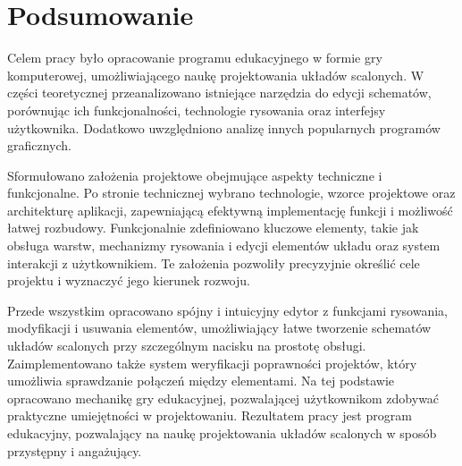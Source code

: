 \chapter{Podsumowanie}
\label{ch:podsumowanie}

Celem pracy było opracowanie programu edukacyjnego w formie gry komputerowej,
umożliwiającego naukę projektowania układów scalonych.
W części teoretycznej przeanalizowano istniejące narzędzia do edycji schematów,
porównując ich funkcjonalności, technologie rysowania oraz interfejsy użytkownika.
Dodatkowo uwzględniono analizę innych popularnych programów graficznych.


Sformułowano założenia projektowe obejmujące aspekty techniczne i funkcjonalne.
Po stronie technicznej wybrano technologie,
wzorce projektowe oraz architekturę aplikacji,
zapewniającą efektywną implementację funkcji i możliwość łatwej rozbudowy.
Funkcjonalnie zdefiniowano kluczowe elementy, takie jak obsługa warstw,
mechanizmy rysowania i edycji elementów układu oraz system interakcji z użytkownikiem.
Te założenia pozwoliły precyzyjnie określić cele projektu i wyznaczyć jego kierunek rozwoju.



Przede wszystkim opracowano spójny i intuicyjny edytor z funkcjami rysowania,
modyfikacji i usuwania elementów,
umożliwiający łatwe tworzenie schematów układów scalonych przy szczególnym nacisku na prostotę obsługi.
Zaimplementowano także system weryfikacji poprawności projektów,
który umożliwia sprawdzanie połączeń między elementami.
Na tej podstawie opracowano mechanikę gry edukacyjnej,
pozwalającej użytkownikom zdobywać praktyczne umiejętności w projektowaniu.
Rezultatem pracy jest program edukacyjny,
pozwalający na naukę projektowania układów scalonych w sposób przystępny i angażujący.


